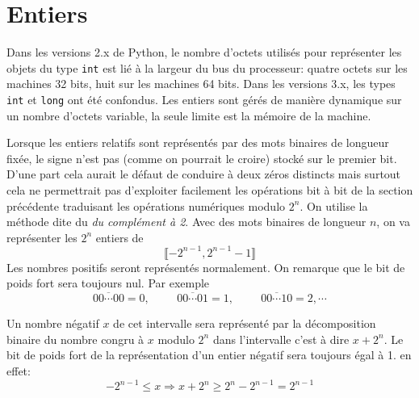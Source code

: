 \section{Entiers}
Dans les versions 2.x de Python, le nombre d'octets utilisés pour représenter les objets du type \verb|int| est lié à la largeur du bus du processeur:  quatre octets sur les machines 32 bits, huit sur les machines 64 bits. Dans les versions 3.x, les types \verb|int| et \verb|long| ont été confondus. Les entiers sont gérés de manière dynamique sur un nombre d'octets variable, la seule limite est la mémoire de la machine.

Lorsque les entiers relatifs sont représentés par des mots binaires de longueur fixée, le signe n'est pas (comme on pourrait le croire) stocké sur le premier bit. D'une part cela aurait le défaut de conduire à deux zéros distincts mais surtout cela ne permettrait pas d'exploiter facilement les opérations bit à bit de la section précédente traduisant les opérations numériques modulo $2^n$.\newline 
On utilise la méthode dite du \emph{du complément à 2}.\newline
Avec des mots binaires de longueur $n$, on va représenter les $2^n$ entiers de 
\begin{displaymath}
  \llbracket -2^{n-1}, 2^{n-1}-1 \rrbracket
\end{displaymath}
Les nombres positifs seront représentés normalement. On remarque que le bit de poids fort sera toujours nul. Par exemple
\begin{displaymath}
  \overline{00\cdots00} = 0, \hspace{1cm}\overline{00\cdots01} = 1, \hspace{1cm}\overline{00\cdots10} = 2, \cdots
\end{displaymath}

Un nombre négatif $x$ de cet intervalle sera représenté par la décomposition binaire du nombre congru à $x$ modulo $2^{n}$ dans l'intervalle c'est à dire $x + 2^n$.\newline
Le bit de poids fort de la représentation d'un entier négatif sera toujours égal à 1. en effet:
\begin{displaymath}
  -2^{n-1} \leq x \Rightarrow x + 2^n \geq 2^n - 2^{n-1} = 2^{n-1}
\end{displaymath}

